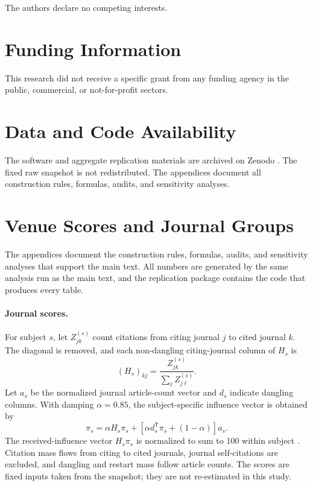 \documentclass[12pt]{article}
\begin{document}
The authors declare no competing interests.

\section{Funding Information}

This research did not receive a specific grant from any funding agency in the public, commercial, or not-for-profit sectors.

\section{Data and Code Availability}
\label{sec:data-availability}

The software and aggregate replication materials are archived on Zenodo \parencite{dataset_zenodo}.  The fixed raw snapshot is not redistributed.  The appendices document all construction rules, formulas, audits, and sensitivity analyses.

\printbibliography

\clearpage
\appendix
\renewcommand{\thetable}{\thesection\arabic{table}}
\renewcommand{\thefigure}{\thesection\arabic{figure}}
\renewcommand{\theequation}{\thesection\arabic{equation}}

\section{Venue Scores and Journal Groups}
\label{app:venue-scores}

The appendices document the construction rules, formulas, audits, and sensitivity analyses that support the main text.  All numbers are generated by the same analysis run as the main text, and the replication package \parencite{dataset_zenodo} contains the code that produces every table.

\paragraph{Journal scores.}  For subject $s$, let $Z^{(s)}_{jk}$ count citations from citing journal $j$ to cited journal $k$.  The diagonal is removed, and each non-dangling citing-journal column of $H_s$ is
\begin{equation}
  (H_s)_{kj}=\frac{Z^{(s)}_{jk}}{\sum_{\ell}Z^{(s)}_{j\ell}}.
\end{equation}
Let $a_s$ be the normalized journal article-count vector and $d_s$ indicate dangling columns.  With damping $\alpha=0.85$, the subject-specific influence vector is obtained by
\begin{equation}
  \pi_s=\alpha H_s\pi_s+
  \left[\alpha d_s^\mathsf{T}\pi_s+(1-\alpha)\right]a_s.
\end{equation}
The received-influence vector $H_s\pi_s$ is normalized to sum to 100 within subject \parencite{West2008}.  Citation mass flows from citing to cited journals, journal self-citations are excluded, and dangling and restart mass follow article counts.  The scores are fixed inputs taken from the snapshot; they are not re-estimated in this study.
\end{document}
